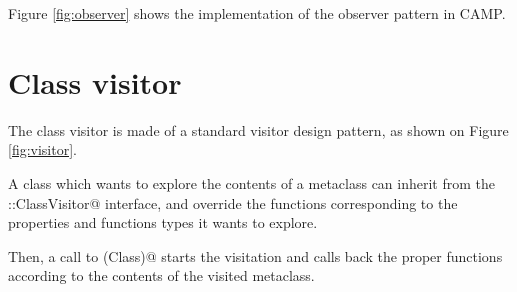 \documentclass[a4paper, twoside]{report}
\begin{document}
	Figure \ref{fig:observer} shows the implementation of the observer pattern in CAMP.


\chapter{Class visitor}

	The class visitor is made of a standard visitor design pattern, as shown on Figure \ref{fig:visitor}.
	
	A class which wants to explore the contents of a metaclass can inherit from the \verb@camp::ClassVisitor@ interface, and
	override the \verb@visit@ functions corresponding to the properties and functions types it wants to explore.
	
	Then, a call to \verb@visit(Class)@ starts the visitation and calls back the proper \verb@visit@ functions according to
	the contents of the visited metaclass.


\newpage

\listoffigures
\end{document}
